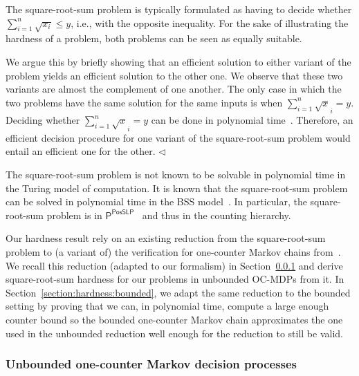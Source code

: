 \documentclass[a4paper,UKenglish,cleveref,autoref,thm-restate,colorlinks]{lipics-v2021}
\newcommand{\ptime}{\textsf{P}}
\newcommand{\posSLP}{\textsf{PosSLP}}
\newcommand{\sqsx}{x} \newcommand{\sqsxVect}{\bar{x}} \newcommand{\sqsm}{m} \newcommand{\sqsy}{y} \newcommand{\sqsi}{i} \newcommand{\sqsn}{n} \newcommand{\sqsSize}{E}
\begin{document}
\begin{remark}
  The square-root-sum problem is typically formulated as having to decide whether $\sum_{\sqsi=1}^\sqsn\sqrt{\sqsx_\sqsi}\leq\sqsy$, i.e., with the opposite inequality.
  For the sake of illustrating the hardness of a problem, both problems can be seen as equally suitable.

  We argue this by briefly showing that an efficient solution to either variant of the problem yields an efficient solution to the other one.
  We observe that these two variants are almost the complement of one another.
  The only case in which the two problems have the same solution for the same inputs is when $\sum_{\sqsi=1}^\sqsn\sqrt{\sqsx}_\sqsi= \sqsy$.
  Deciding whether $\sum_{\sqsi=1}^\sqsn\sqrt{\sqsx}_\sqsi= \sqsy$ can be done in polynomial time~\cite{DBLP:journals/jsc/BorodinFHT85}. Therefore, an efficient decision procedure for one variant of the square-root-sum problem would entail an efficient one for the other.
  \hfill$\lhd$
\end{remark}

The square-root-sum problem is not known to be solvable in polynomial time in the Turing model of computation.
It is known that the square-root-sum problem can be solved in polynomial time in the BSS model~\cite{DBLP:journals/jc/Tiwari92}.
In particular, the square-root-sum problem is in $\ptime^\posSLP$~\cite{DBLP:journals/siamcomp/AllenderBKM09} and thus in the counting hierarchy.

Our hardness result rely on an existing reduction from the square-root-sum problem to (a variant of) the verification for one-counter Markov chains from~\cite{DBLP:journals/pe/EtessamiWY10}.
We recall this reduction (adapted to our formalism) in Section~\ref{section:hardness:unbounded} and derive square-root-sum hardness for our problems in unbounded OC-MDPs from it.
In Section~\ref{section:hardness:bounded}, we adapt the same reduction to the bounded setting by proving that we can, in polynomial time, compute a large enough counter bound so the bounded one-counter Markov chain approximates the one used in the unbounded reduction well enough for the reduction to still be valid.

\subsubsection{Unbounded one-counter Markov decision processes}\label{section:hardness:unbounded}
\end{document}
